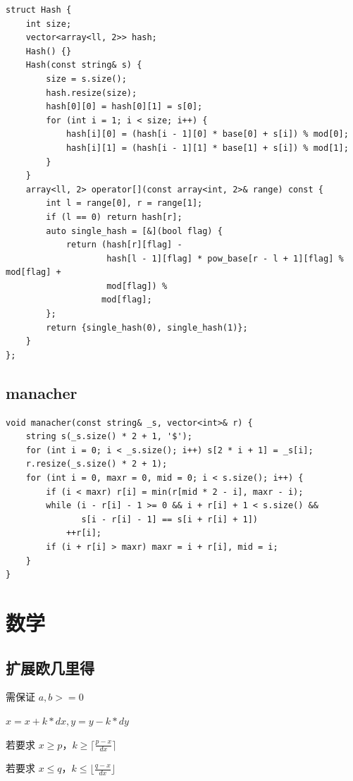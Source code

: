 \documentclass[UTF8]{ctexart}
\begin{document}
\begin{sloppypar}
\begin{lstlisting}[style=cpp]
struct Hash {
    int size;
    vector<array<ll, 2>> hash;
    Hash() {}
    Hash(const string& s) {
        size = s.size();
        hash.resize(size);
        hash[0][0] = hash[0][1] = s[0];
        for (int i = 1; i < size; i++) {
            hash[i][0] = (hash[i - 1][0] * base[0] + s[i]) % mod[0];
            hash[i][1] = (hash[i - 1][1] * base[1] + s[i]) % mod[1];
        }
    }
    array<ll, 2> operator[](const array<int, 2>& range) const {
        int l = range[0], r = range[1];
        if (l == 0) return hash[r];
        auto single_hash = [&](bool flag) {
            return (hash[r][flag] -
                    hash[l - 1][flag] * pow_base[r - l + 1][flag] % mod[flag] +
                    mod[flag]) %
                   mod[flag];
        };
        return {single_hash(0), single_hash(1)};
    }
};
\end{lstlisting}

\subsection{manacher}

\begin{lstlisting}[style=cpp]
void manacher(const string& _s, vector<int>& r) {
    string s(_s.size() * 2 + 1, '$');
    for (int i = 0; i < _s.size(); i++) s[2 * i + 1] = _s[i];
    r.resize(_s.size() * 2 + 1);
    for (int i = 0, maxr = 0, mid = 0; i < s.size(); i++) {
        if (i < maxr) r[i] = min(r[mid * 2 - i], maxr - i);
        while (i - r[i] - 1 >= 0 && i + r[i] + 1 < s.size() &&
               s[i - r[i] - 1] == s[i + r[i] + 1])
            ++r[i];
        if (i + r[i] > maxr) maxr = i + r[i], mid = i;
    }
}
\end{lstlisting}

\clearpage

\section{数学}

\subsection{扩展欧几里得}

需保证 $a,b>=0$

$x=x+k*dx,y=y-k*dy$

若要求 $x\ge p$，$k\ge\lceil \frac{p-x}{dx}\rceil$

若要求 $x\le q$，$k\le\lfloor \frac{q-x}{dx}\rfloor$


\end{sloppypar}
\end{document}
